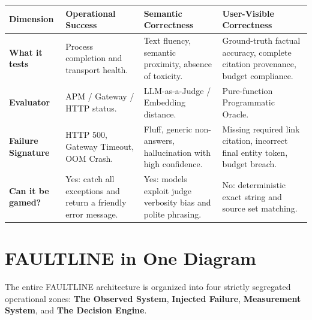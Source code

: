 \begin{center}
\small
\begin{tabularx}{\textwidth}{l>{\raggedright\arraybackslash}p{}>{\raggedright\arraybackslash}p{}X}
\toprule
\textbf{Dimension} & \textbf{Operational Success} & \textbf{Semantic Correctness} & \textbf{User-Visible Correctness} \\
\midrule
\textbf{What it tests} & Process completion and transport health. & Text fluency, semantic proximity, absence of toxicity. & Ground-truth factual accuracy, complete citation provenance, budget compliance. \\
\addlinespace
\textbf{Evaluator} & APM / Gateway / HTTP status. & LLM-as-a-Judge / Embedding distance. & Pure-function Programmatic Oracle. \\
\addlinespace
\textbf{Failure Signature} & HTTP 500, Gateway Timeout, OOM Crash. & Fluff, generic non-answers, hallucination with high confidence. & Missing required link citation, incorrect final entity token, budget breach. \\
\addlinespace
\textbf{Can it be gamed?} & Yes: catch all exceptions and return a friendly error message. & Yes: models exploit judge verbosity bias and polite phrasing. & No: deterministic exact string and source set matching. \\
\bottomrule
\end{tabularx}
\end{center}

\vspace{12pt}
\section{FAULTLINE in One Diagram}

The entire FAULTLINE architecture is organized into four strictly segregated operational zones: \textbf{The Observed System}, \textbf{Injected Failure}, \textbf{Measurement System}, and \textbf{The Decision Engine}.

